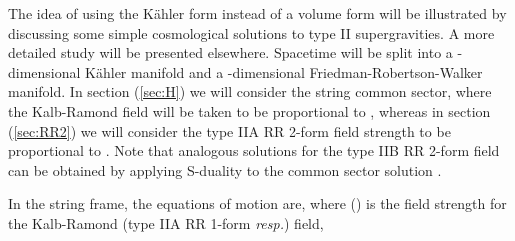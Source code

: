 \documentclass[a4paper,11pt]{article}
\begin{document}
The idea of using the K\"ahler form instead of a volume form
will be illustrated by discussing some simple cosmological 
solutions to type II supergravities. A more detailed study will
be presented elsewhere. 
Spacetime will be split into
a \coordHE{}-dimensional K\"ahler manifold
and a \coordHE{}-dimensional Friedman-Robertson-Walker manifold.
In section (\ref{sec:H}) we will consider the string common sector,
where the Kalb-Ramond field will be taken to be proportional
to \coordHE{}, whereas in section (\ref{sec:RR2})
we will consider the type IIA RR 2-form field strength
to be proportional to \coordHE{}.
Note that analogous solutions for the type IIB RR 2-form field can be obtained
by applying S-duality to the common sector solution \cite{art:BHO}.
\par
In the string frame, the equations of motion are, where \coordHE{} (\coordHE{})
is the field strength for the Kalb-Ramond
(type IIA RR 1-form {\em resp.}) field,
\end{document}
